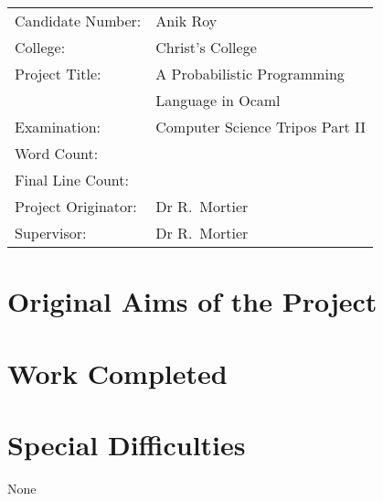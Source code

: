 \documentclass[12pt,notitlepage,twoside,a4paper]{report}
\begin{document}
{\large

\begin{tabular}{ll}
Candidate Number:               &  Anik Roy                       \\
College:            &  Christ's College                     \\
Project Title:      &  A Probabilistic Programming \\
&
 Language in Ocaml \\
Examination:        & Computer Science Tripos Part II        \\
Word Count:  
& \footnotemark[1]\\
Final Line Count:         & \footnotemark[2] \\
Project Originator: & Dr R.~Mortier                    \\
Supervisor:         & Dr R.~Mortier                    \\ 
\end{tabular}
}



\section*{Original Aims of the Project}

\section*{Work Completed}

\section*{Special Difficulties}
None

\newpage


\cleardoublepage

\tableofcontents
\listoffigures
\lstlistoflistings


\cleardoublepage        %

\setcounter{page}{1}
\pagestyle{headings}
\end{document}
